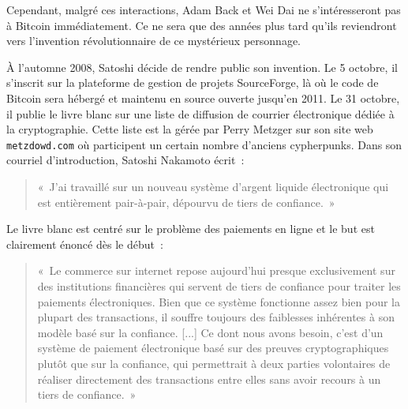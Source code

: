 Cependant, malgré ces interactions, Adam Back et Wei Dai ne s'intéresseront pas à Bitcoin immédiatement. Ce ne sera que des années plus tard qu'ils reviendront vers l'invention révolutionnaire de ce mystérieux personnage.


À l'automne 2008, Satoshi décide de rendre public son invention. Le 5 octobre, il s'inscrit sur la plateforme de gestion de projets SourceForge, là où le code de Bitcoin sera hébergé et maintenu en source ouverte jusqu'en 2011. Le 31 octobre, il publie le livre blanc sur une liste de diffusion de courrier électronique dédiée à la cryptographie. Cette liste est la  gérée par Perry Metzger sur son site web \verb?metzdowd.com? où participent un certain nombre d'anciens cypherpunks. Dans son courriel d'introduction, Satoshi Nakamoto écrit~:

\begin{quote}
«~J'ai travaillé sur un nouveau système d'argent liquide électronique qui est entièrement pair-à-pair, dépourvu de tiers de confiance.~»
\end{quote}

Le livre blanc est centré sur le problème des paiements en ligne et le but est clairement énoncé dès le début~:

\begin{quote}
«~Le commerce sur internet repose aujourd'hui presque exclusivement sur des institutions financières qui servent de tiers de confiance pour traiter les paiements électroniques. Bien que ce système fonctionne assez bien pour la plupart des transactions, il souffre toujours des faiblesses inhérentes à son modèle basé sur la confiance. [...] Ce dont nous avons besoin, c'est d'un système de paiement électronique basé sur des preuves cryptographiques plutôt que sur la confiance, qui permettrait à deux parties volontaires de réaliser directement des transactions entre elles sans avoir recours à un tiers de confiance.~»
\end{quote}

